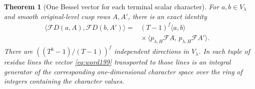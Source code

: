 \documentclass[a4paper,11pt]{article}
\newtheorem{theorem}[proposition]{Theorem}
\theoremstyle{definition}
\theoremstyle{remark}
\numberwithin{equation}{section}
\begin{document}
\begin{theorem}[One Bessel vector for each terminal scalar character]
\label{thm:bessel199}
For \(a,b\in V_\lambda\) and smooth original-level cusp rows
\(A,A'\), there is an exact identity
\begin{equation}
 \begin{split}
 \langle\mathcal F D(a,A),\mathcal F D(b,A')\rangle
    ={}& (T-1)^f\langle a,b\rangle\\[-2pt]
       &{}\times\langle p_{\lambda,H}\mathcal F A,\,
                         p_{\lambda,H}\mathcal F A'\rangle .
 \end{split}                                           \label{eq:bessel199}
\end{equation}
There are \(((T^k-1)/(T-1))^f\) independent directions in
\(V_\lambda\). In each tuple of residue lines the vector
\eqref{eq:word199} transported to those lines is an integral
generator of the corresponding one-dimensional character space
over the ring of integers containing the character values.
\end{theorem}
\end{document}
